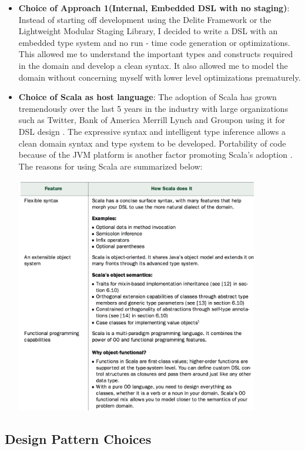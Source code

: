 \documentclass[12 pt]{article}
\begin{document}
\begin{itemize}
\item \textbf{Choice of Approach 1(Internal, Embedded DSL with no staging)}: Instead of starting off development using the Delite Framework or the Lightweight Modular Staging Library, I decided to write a DSL with an embedded type system and no run - time code generation or optimizations. This allowed me to understand the important types and constructs required in the domain and develop a clean syntax. It also allowed me to model the domain without concerning myself with lower level optimizations prematurely.

\item \textbf{Choice of Scala as host language}: The adoption of Scala has grown tremendously over the last 5 years in the industry with large organizations such as Twitter, Bank of America Merrill Lynch and Groupon using it for DSL design \cite{scala}. The expressive syntax and intelligent type inference allows a clean domain syntax and type system to be developed. Portability of code because of the JVM platform is another factor promoting Scala's adoption \cite{scala}. The reasons for using Scala are summarized below:
\begin{center}
    \includegraphics[width=400px]{figures/scala_motivation.png}
\end{center}

\end{itemize}
\subsection{Design Pattern Choices}
\end{document}

